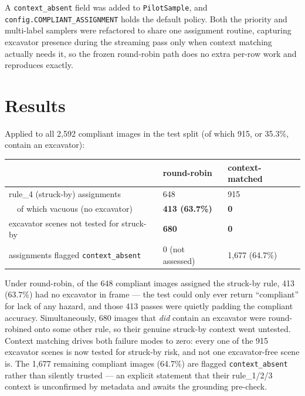A \texttt{context\_absent} field was added to \texttt{PilotSample}, and
\texttt{config.COMPLIANT\_ASSIGNMENT} holds the default policy. Both the priority and multi-label
samplers were refactored to share one assignment routine, capturing excavator presence during the
streaming pass only when context matching actually needs it, so the frozen round-robin path does no
extra per-row work and reproduces exactly.

\section{Results}

Applied to all 2{,}592 compliant images in the test split (of which 915, or 35.3\%, contain an
excavator):

\begin{center}
\begin{tabular}{p{6.6cm}p{3.0cm}p{3.0cm}}
\toprule
\textbf{} & \textbf{round-robin} & \textbf{context-matched} \\
\midrule
rule\_4 (struck-by) assignments        & 648 & 915 \\
\ \ of which vacuous (no excavator)    & \textbf{413 (63.7\%)} & \textbf{0} \\
excavator scenes not tested for struck-by & \textbf{680} & \textbf{0} \\
assignments flagged \texttt{context\_absent} & 0 (not assessed) & 1{,}677 (64.7\%) \\
\bottomrule
\end{tabular}
\label{tab:p13-vacuous}
\end{center}

Under round-robin, of the 648 compliant images assigned the struck-by rule, 413 (63.7\%) had no
excavator in frame --- the test could only ever return ``compliant'' for lack of any hazard, and those
413 passes were quietly padding the compliant accuracy. Simultaneously, 680 images that \emph{did}
contain an excavator were round-robined onto some other rule, so their genuine struck-by context went
untested. Context matching drives both failure modes to zero: every one of the 915 excavator scenes is
now tested for struck-by risk, and not one excavator-free scene is. The 1{,}677 remaining compliant
images (64.7\%) are flagged \texttt{context\_absent} rather than silently trusted --- an explicit
statement that their rule\_1/2/3 context is unconfirmed by metadata and awaits the grounding pre-check.

